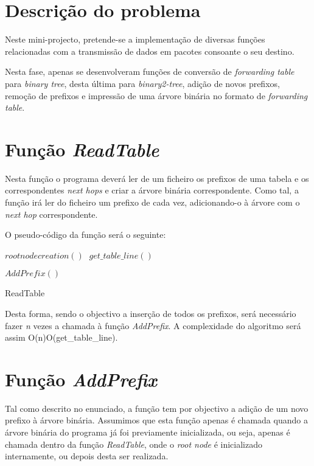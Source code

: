 \documentclass[twocolumn]{article}
\begin{document}

\section{Descrição do problema}
Neste mini-projecto, pretende-se a implementação de diversas funções relacionadas com a transmissão de dados em pacotes consoante
o seu destino.

Nesta fase, apenas se desenvolveram funções de conversão de \textit{forwarding table} para \textit{binary tree}, desta última para
\textit{binary2-tree}, adição de novos prefixos, remoção de prefixos e impressão de uma árvore binária no formato de
\textit{forwarding table}.

\section{Função \textit{ReadTable}}
Nesta função o programa deverá ler de um ficheiro os prefixos de uma tabela e os correspondentes \textit{next hops} e criar a 
árvore binária correspondente.
Como tal, a função irá ler do ficheiro um prefixo de cada vez, adicionando-o à árvore com o \textit{next hop} correspondente.

O pseudo-código da função será o seguinte:

\begin{algorithmic}
 \State $root node creation()\;$
   \State $get\_table\_line()\;$
  
   \State $ AddPrefix()\;$
 \EndWhile
 
\Return\;
 \caption{ReadTable}
\end{algorithmic}
Desta forma, sendo o objectivo a inserção de todos os prefixos, será necessário fazer \textit{n} vezes a chamada à função \textit{AddPrefix}. A complexidade do algoritmo será assim O(n)O(get\_table\_line).

\section{Função \textit{AddPrefix}}
Tal como descrito no enunciado, a função tem por objectivo a adição de um novo prefixo à árvore binária. Assumimos que esta função apenas é chamada quando a árvore binária do programa já foi previamente inicializada, ou seja, apenas é chamada dentro da função \textit{ReadTable}, onde o \textit{root node} é inicializado internamente, ou depois desta ser realizada.
\end{document}
